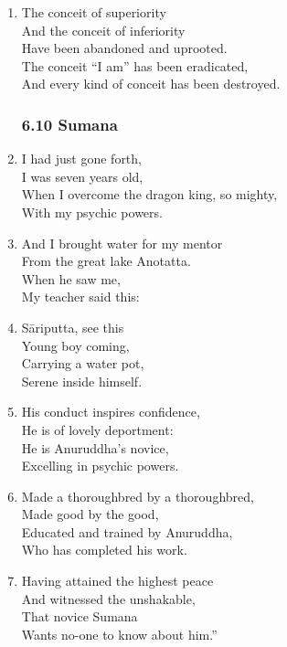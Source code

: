 \documentclass[10pt, openany]{book}
\newcommand*{\vleftofline}[1]{\leavevmode\llap{#1}}
\begin{document}
\begin{enumerate}
\item The conceit of superiority \\
And the conceit of inferiority\\
Have been abandoned and uprooted.\\
The conceit “I am” has been eradicated,\\
And every kind of conceit has been destroyed.

\subsubsection*{6.10 Sumana}

\item I had just gone forth,\\
I was seven years old,\\
When I overcome the dragon king, so mighty,\\
With my psychic powers.

\item And I brought water for my mentor\\
From the great lake Anotatta.\\
When he saw me,\\
My teacher said this:

\item \vleftofline{“}Sāriputta, see this\\
Young boy coming,\\
Carrying a water pot,\\
Serene inside himself.

\item His conduct inspires confidence,\\
He is of lovely deportment:\\
He is Anuruddha’s novice,\\
Excelling in psychic powers.

\item Made a thoroughbred by a thoroughbred,\\
Made good by the good,\\
Educated and trained by Anuruddha,\\
Who has completed his work.

\item Having attained the highest peace\\
And witnessed the unshakable,\\
That novice Sumana\\
Wants no-one to know about him.”


\end{enumerate}
\end{document}
